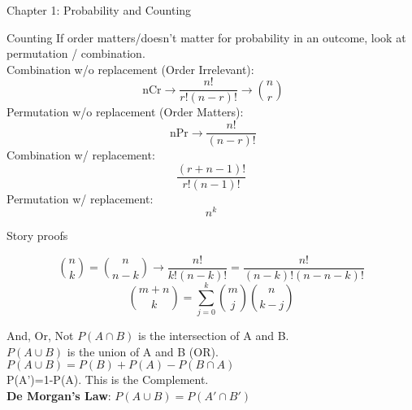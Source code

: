 \documentclass[a4paper, 12pt]{article}
\begin{document}
\begin{section}{Chapter 1: Probability and Counting}
\begin{subsection}{Counting}
If order matters/doesn't matter for probability in an outcome, 
look at permutation / combination.\\
Combination w/o replacement (Order Irrelevant):
\begin{equation} 
	\mbox{ nCr} \to \frac{n!}{r!(n-r)!} \to
	{n \choose r}
\end{equation}
Permutation w/o replacement (Order Matters):
\begin{equation} 
	\mbox{ nPr} \to \frac{n!}{(n-r)!}
\end{equation}
Combination w/ replacement:
\begin{equation} 
	\frac{(r+n-1)!}{r!(n-1)!}
\end{equation}
Permutation w/ replacement:
\begin{equation} 
n^{k}
\end{equation}

\end{subsection}
\begin{subsection}{Story proofs}

\begin{equation} 
	{n \choose k} = {n \choose n-k} \to \frac{n!}{k!(n-k)!}=
	\frac{n!}{(n-k)!(n-n-k)!}
\end{equation}
\begin{equation} 
	{m+n \choose k}=\sum_{j=0}^{k}{m \choose j}{n \choose k-j}
\end{equation}
\end{subsection}
\begin{subsection}{And, Or, Not}
$P(A\cap B)$ is the intersection of A and B.\\
$P(A\cup B)$ is the union of A and B (OR). 
$P(A\cup B)=P(B)+P(A)-P(B\cap A)$\\
P(A')=1-P(A). This is the Complement.\\
\textbf{De Morgan's Law}: $P(A\cup B) = P(A' \cap B')$
\end{subsection}
\end{section}
\end{document}
